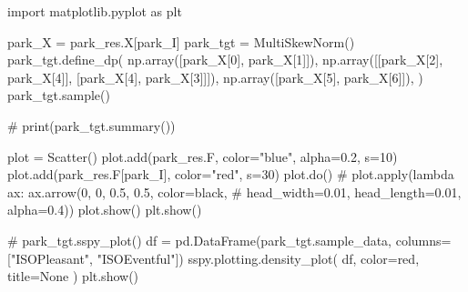\documentclass[
  authoryear,
  preprint,
  3p]{elsarticle}
\newenvironment{Shaded}{\begin{snugshade}}{\end{snugshade}}
\newcommand{\CommentTok}[1]{\textcolor[rgb]{0.37,0.37,0.37}{#1}}
\newcommand{\DecValTok}[1]{\textcolor[rgb]{0.68,0.00,0.00}{#1}}
\newcommand{\FloatTok}[1]{\textcolor[rgb]{0.68,0.00,0.00}{#1}}
\newcommand{\ImportTok}[1]{\textcolor[rgb]{0.00,0.46,0.62}{#1}}
\newcommand{\NormalTok}[1]{\textcolor[rgb]{0.00,0.23,0.31}{#1}}
\newcommand{\OperatorTok}[1]{\textcolor[rgb]{0.37,0.37,0.37}{#1}}
\newcommand{\StringTok}[1]{\textcolor[rgb]{0.13,0.47,0.30}{#1}}
\newcommand{\VariableTok}[1]{\textcolor[rgb]{0.07,0.07,0.07}{#1}}
\begin{document}
\begin{Shaded}
\begin{Highlighting}[]
\ImportTok{import}\NormalTok{ matplotlib.pyplot }\ImportTok{as}\NormalTok{ plt}

\NormalTok{park\_X }\OperatorTok{=}\NormalTok{ park\_res.X[park\_I]}
\NormalTok{park\_tgt }\OperatorTok{=}\NormalTok{ MultiSkewNorm()}
\NormalTok{park\_tgt.define\_dp(}
\NormalTok{    np.array([park\_X[}\DecValTok{0}\NormalTok{], park\_X[}\DecValTok{1}\NormalTok{]]),}
\NormalTok{    np.array([[park\_X[}\DecValTok{2}\NormalTok{], park\_X[}\DecValTok{4}\NormalTok{]], [park\_X[}\DecValTok{4}\NormalTok{], park\_X[}\DecValTok{3}\NormalTok{]]]),}
\NormalTok{    np.array([park\_X[}\DecValTok{5}\NormalTok{], park\_X[}\DecValTok{6}\NormalTok{]]),}
\NormalTok{)}
\NormalTok{park\_tgt.sample()}

\CommentTok{\# print(park\_tgt.summary())}

\NormalTok{plot }\OperatorTok{=}\NormalTok{ Scatter()}
\NormalTok{plot.add(park\_res.F, color}\OperatorTok{=}\StringTok{"blue"}\NormalTok{, alpha}\OperatorTok{=}\FloatTok{0.2}\NormalTok{, s}\OperatorTok{=}\DecValTok{10}\NormalTok{)}
\NormalTok{plot.add(park\_res.F[park\_I], color}\OperatorTok{=}\StringTok{"red"}\NormalTok{, s}\OperatorTok{=}\DecValTok{30}\NormalTok{)}
\NormalTok{plot.do()}
\CommentTok{\# plot.apply(lambda ax: ax.arrow(0, 0, 0.5, 0.5, color=\textquotesingle{}black\textquotesingle{},}
\CommentTok{\#                                head\_width=0.01, head\_length=0.01, alpha=0.4))}
\NormalTok{plot.show()}
\NormalTok{plt.show()}



\CommentTok{\# park\_tgt.sspy\_plot()}
\NormalTok{df }\OperatorTok{=}\NormalTok{ pd.DataFrame(park\_tgt.sample\_data, columns}\OperatorTok{=}\NormalTok{[}\StringTok{"ISOPleasant"}\NormalTok{, }\StringTok{"ISOEventful"}\NormalTok{])}
\NormalTok{sspy.plotting.density\_plot(}
\NormalTok{    df, color}\OperatorTok{=}\StringTok{\textquotesingle{}red\textquotesingle{}}\NormalTok{, title}\OperatorTok{=}\VariableTok{None}
\NormalTok{)}
\NormalTok{plt.show()}
\end{Highlighting}
\end{Shaded}
\end{document}
